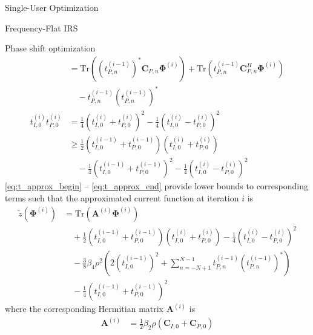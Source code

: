 \documentclass{IEEEtran}
\begin{document}
\begin{section}{Single-User Optimization}
\begin{subsection}{Frequency-Flat IRS}
\begin{subsubsection}{Phase shift optimization}
\begin{align}
				& = \mathrm{Tr}\left((t_{P,n}^{(i-1)})^*\boldsymbol{C}_{P,n}\boldsymbol{\Phi}^{(i)}\right) + \mathrm{Tr}\left(t_{P,n}^{(i-1)}\boldsymbol{C}_{P,n}^H\boldsymbol{\Phi}^{(i)}\right)\nonumber\\
				& \quad- t_{P,n}^{(i-1)} (t_{P,n}^{(i-1)})^*\\
				t_{I,0}^{(i)} t_{P,0}^{(i)}
				& = \frac{1}{4}(t_{I,0}^{(i)} + t_{P,0}^{(i)})^2 - \frac{1}{4}(t_{I,0}^{(i)} - t_{P,0}^{(i)})^2\nonumber\\
				& \ge \frac{1}{2}(t_{I,0}^{(i-1)} + t_{P,0}^{(i-1)})(t_{I,0}^{(i)} + t_{P,0}^{(i)})\nonumber\\
				& \quad - \frac{1}{4}(t_{I,0}^{(i-1)} + t_{P,0}^{(i-1)})^2 - \frac{1}{4}(t_{I,0}^{(i)} - t_{P,0}^{(i)})^2\label{eq:t_approx_end}
			\end{align}
			\ref{eq:t_approx_begin} -- \ref{eq:t_approx_end} provide lower bounds to corresponding terms such that the approximated current function at iteration $i$ is
			\begin{equation}\label{eq:z_irs_approx}
				\begin{split}
					\tilde{z}(\boldsymbol{\Phi}^{(i)})
					& = \mathrm{Tr}(\boldsymbol{A}^{(i)}\boldsymbol{\Phi}^{(i)})\\
					& \quad + \frac{1}{2}(t_{I,0}^{(i-1)} + t_{P,0}^{(i-1)})(t_{I,0}^{(i)} + t_{P,0}^{(i)}) - \frac{1}{4}(t_{I,0}^{(i)} - t_{P,0}^{(i)})^2\\
					& \quad - \frac{3}{8} \beta_4 \rho^2 \left(2 (t_{I,0}^{(i-1)})^2 + \sum_{n=-N+1}^{N-1} t_{P,n}^{(i-1)} (t_{P,n}^{(i-1)})^* \right)\\
					& \quad - \frac{1}{4}(t_{I,0}^{(i-1)} + t_{P,0}^{(i-1)})^2
				\end{split}
			\end{equation}
			where the corresponding Hermitian matrix $\boldsymbol{A}^{(i)}$ is
			\begin{equation}\label{eq:A}
				\begin{split}
					\boldsymbol{A}^{(i)}
					& = \frac{1}{2} \beta_2 \rho (\boldsymbol{C}_{I,0}+\boldsymbol{C}_{P,0})\\

\end{split}
\end{equation}
\end{subsubsection}
\end{subsection}
\end{section}
\end{document}
